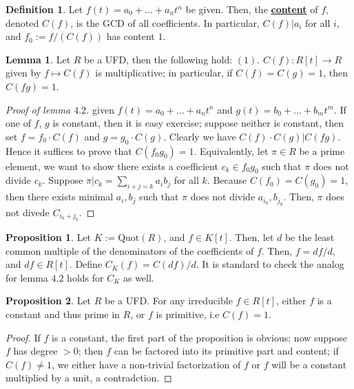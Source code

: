 \documentclass{article}
\theoremstyle{definition}
\theoremstyle{definition}
\theoremstyle{definition}
\newtheorem{proposition}{Proposition}[section]
\theoremstyle{definition}
\newtheorem{lemma}[theorem]{Lemma}
\theoremstyle{definition}
\newtheorem{definition}{Definition}[section]
\theoremstyle{definition}
\theoremstyle{definition}
\begin{document}
\begin{tcolorbox}[colback=purple!5!white,colframe=purple!75!black]
\begin{definition}
    Let $f(t)=a_0+...+a_nt^n$ be given. Then, the \underline{\textbf{content}} of $f$, denoted $C(f)$, is the GCD of all coefficients. In particular, $C(f)|a_i$ for all $i$, and $f_0:=f/(C(f))$ has content $1$. 
\end{definition}
\end{tcolorbox}


\begin{tcolorbox}
\begin{lemma}
    Let $R$ be a UFD, then the following hold: $(1).$ $C(f): R[t]\to R$ given by $f\mapsto C(f)$ is multiplicative; in particular, if $C(f)=C(g)=1$, then $C(fg)=1$. 
\end{lemma}
\end{tcolorbox}

\begin{proof}[Proof of lemma $4.2$]
 given $f(t)=a_0+...+a_nt^n$ and $g(t)=b_0+...+b_mt^m$. If one of $f$, $g$ is constant, then it is easy exercise; suppose neither is constant, then set $f=f_0\cdot C(f)$ and $g=g_0\cdot C(g)$. Clearly we have $C(f)\cdot C(g)| C(fg)$. Hence it suffices to prove that $C(f_0g_0)=1$. Equivalently, let $\pi\in R$ be a prime element, we want to show there exists a coefficient $c_k\in f_0g_0$ such that $\pi$ does not divide $c_k$. Suppose $\pi| c_k=\sum_{i+j=k}a_ib_j$ for all $k$. Because $C(f_0)=C(g_0)=1$, then there exists minimal $a_i,b_j$ such that $\pi$ does not divide $a_{i_0},b_{j_0}$. Then, $\pi$ does not divede $C_{i_0+j_0}$.

\end{proof}



\begin{tcolorbox}[colback=blue!5!white,colframe=blue!30!white]
\begin{proposition}
    Let $K:=\textrm{Quot}(R)$, and $f\in K[t]$. Then, let $d$ be the least common multiple of the denominators of the coefficients of $f$. Then, $f=df/d$, and $df\in R[t]$. Define $C_{K}(f)=C(df)/d$. It is standard to check the analog for lemma $4.2$ holds for $C_K$ as well. 
\end{proposition}
\end{tcolorbox}


\begin{tcolorbox}[colback=blue!5!white,colframe=blue!30!white]
\begin{proposition}
Let $R$ be a UFD. For any irreducible $f\in R[t]$, either $f$ is a constant and thus prime in $R$, or $f$ is primitive, i.e $C(f)=1$.
\end{proposition}
\end{tcolorbox}
\begin{proof}
    If $f$ is a constant, the first part of the proposition is obvious; now suppose $f$ has degree $>0$; then $f$ can be factored into its primitive part and content; if $C(f)\neq 1$, we either have a non-trivial factorization of $f$ or $f$ will be a constant multiplied by a unit, a contradction.
\end{proof}
\end{document}
